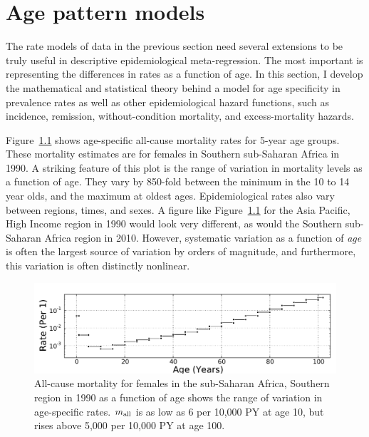 \chapter{Age pattern models}
\label{theory-age_pattern_model}
The rate models of data in the previous section need several
extensions to be truly useful in descriptive epidemiological
meta-regression.  The most important is representing the differences in
rates as a function of age.  In this section, I develop the
mathematical and statistical theory behind a model for age specificity
in prevalence rates as well as other epidemiological hazard functions,
such as incidence, remission, without-condition mortality, and
excess-mortality hazards.

Figure~\ref{ssas-mx_female_1990} shows age-specific all-cause
mortality rates for 5-year age groups.  These mortality estimates are
for females in Southern sub-Saharan Africa in 1990.  A striking
feature of this plot is the range of variation in mortality levels as
a function of age.  They vary by 850-fold between the minimum
in the 10 to 14 year olds, and the maximum at oldest
ages. Epidemiological rates also vary between regions, times, and
sexes.  A figure like Figure~\ref{ssas-mx_female_1990} for the Asia
Pacific, High Income region in 1990 would look very different, as
would the Southern sub-Saharan Africa region in 2010. However,
systematic variation as a function of \emph{age} is often the largest
source of variation by orders of magnitude, and furthermore, this
variation is often distinctly nonlinear.

\begin{figure}[h]
\begin{center}
\includegraphics[width=\textwidth]{ssas-mx_female_1990.pdf}
\caption{All-cause mortality for females in the sub-Saharan Africa,
  Southern region in 1990 as a function of age shows the range of
  variation in age-specific rates.  $m_{\text{all}}$ is as low as 6 per
  10,000 PY at age 10, but rises above 5,000 per 10,000 PY at age 100.}
\label{ssas-mx_female_1990}
\end{center}
\end{figure}

